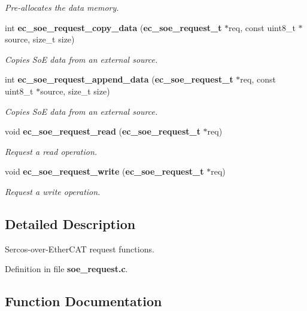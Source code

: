 \begin{DoxyCompactItemize}
\begin{DoxyCompactList}\small\item\em Pre-\/allocates the data memory. \end{DoxyCompactList}\item 
int {\bf ec\-\_\-soe\-\_\-request\-\_\-copy\-\_\-data} ({\bf ec\-\_\-soe\-\_\-request\-\_\-t} $\ast$req, const uint8\-\_\-t $\ast$source, size\-\_\-t size)
\begin{DoxyCompactList}\small\item\em Copies So\-E data from an external source. \end{DoxyCompactList}\item 
int {\bf ec\-\_\-soe\-\_\-request\-\_\-append\-\_\-data} ({\bf ec\-\_\-soe\-\_\-request\-\_\-t} $\ast$req, const uint8\-\_\-t $\ast$source, size\-\_\-t size)
\begin{DoxyCompactList}\small\item\em Copies So\-E data from an external source. \end{DoxyCompactList}\item 
void {\bf ec\-\_\-soe\-\_\-request\-\_\-read} ({\bf ec\-\_\-soe\-\_\-request\-\_\-t} $\ast$req)
\begin{DoxyCompactList}\small\item\em Request a read operation. \end{DoxyCompactList}\item 
void {\bf ec\-\_\-soe\-\_\-request\-\_\-write} ({\bf ec\-\_\-soe\-\_\-request\-\_\-t} $\ast$req)
\begin{DoxyCompactList}\small\item\em Request a write operation. \end{DoxyCompactList}\end{DoxyCompactItemize}


\subsection{Detailed Description}
Sercos-\/over-\/\-Ether\-C\-A\-T request functions. 

Definition in file {\bf soe\-\_\-request.\-c}.



\subsection{Function Documentation}
